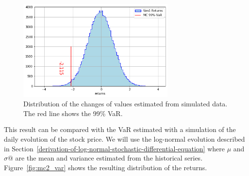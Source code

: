 \begin{figure}[htb]
	\centering
	\includegraphics[width=0.7\textwidth]{figures/sim1_var}
	\caption{Distribution of the changes of values estimated from simulated data. The red line shows the 99\% VaR.}
	\label{fig:mc1_var}
\end{figure}

This result can be compared with the VaR estimated with a simulation of the daily evolution of the stock price. We will use the log-normal evolution described in Section~\ref{derivation-of-log-normal-stochastic-differential-equation} where $\mu$ and $\sigma@$ are the mean and variance estimated from the historical series. Figure~\ref{fig:mc2_var} shows the resulting distribution of the returns.

